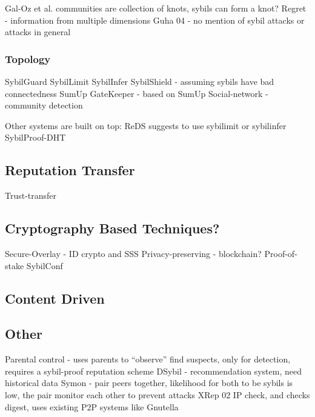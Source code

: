 Gal-Oz et al. \cite{gal2008robust} communities are collection of knots, sybils can form a knot?
Regret\cite{sabater2001regret, sabater2002social} - information from multiple dimensions
Guha 04\cite{guha2004propagation} - no mention of sybil attacks or attacks in general

\subsubsection{Topology}
SybilGuard\cite{yu2006sybilguard}
SybilLimit\cite{yu2008sybillimit}
SybilInfer\cite{danezis2009sybilinfer}
SybilShield\cite{shi2013sybilshield} - assuming sybils have bad connectedness
SumUp\cite{tran2009sybil}
GateKeeper\cite{tran2011optimal} - based on SumUp
Social-network\cite{viswanath2010analysis} - community detection


Other systems are built on top:
ReDS\cite{akavipat2014reds} suggests to use sybilimit or sybilinfer
SybilProof-DHT\cite{lesniewski2010whanau}

\subsection{Reputation Transfer}
Trust-transfer\cite{seigneur2005trust}

\subsection{Cryptography Based Techniques?}
Secure-Overlay\cite{lua2007securing} - ID crypto and SSS
Privacy-preserving\cite{schaub2016trustless} - blockchain?
Proof-of-stake\cite{dennis2016rep}
SybilConf\cite{tegeler2010sybilconf}

\subsection{Content Driven}
\cite{chatterjee2008robust}

\subsection{Other}
Parental control\cite{tehale2012parental} - uses parents to ``observe'' find suspects, only for detection, requires a sybil-proof reputation scheme
DSybil\cite{yu2009dsybil} - recommendation system, need historical data
Symon\cite{jyothi2009symon} - pair peers together, likelihood for both to be sybils is low, the pair monitor each other to prevent attacks
XRep 02\cite{damiani2002reputation} IP check, and checks digest, uses existing P2P systems like Gnutella

